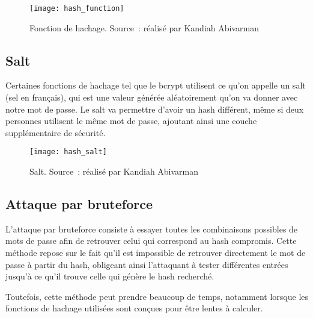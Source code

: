 \begin{figure}[tbph!]
	\centering
	\texttt{[image: hash\_function]}
	\caption[Fonction de hachage]{Fonction de hachage. Source : réalisé par Kandiah Abivarman}
	\label{fig:fonction_hachage}
\end{figure}


\subsection{Salt}

Certaines fonctions de hachage tel que le bcrypt utilisent ce qu'on appelle un salt (sel en français), qui est une valeur générée aléatoirement qu'on va donner avec notre mot de passe. Le salt va permettre d'avoir un hash différent, même si deux personnes utilisent le même mot de passe, ajoutant ainsi une couche supplémentaire de sécurité.

\begin{figure}[tbph!]
	\centering
	\texttt{[image: hash\_salt]}
	\caption[Salt]{Salt. Source : réalisé par Kandiah Abivarman}
	\label{fig:hash_salt}
\end{figure}

\newpage

\subsection{Attaque par bruteforce}

L'attaque par bruteforce consiste à essayer toutes les combinaisons possibles de mots de passe afin de retrouver celui qui correspond au hash compromis. Cette méthode repose sur le fait qu'il est impossible de retrouver directement le mot de passe à partir du hash, obligeant ainsi l'attaquant à tester différentes entrées jusqu'à ce qu'il trouve celle qui génère le hash recherché.

Toutefois, cette méthode peut prendre beaucoup de temps, notamment lorsque les fonctions de hachage utilisées sont conçues pour être lentes à calculer.